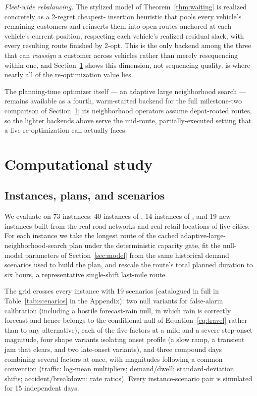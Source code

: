 \documentclass[trsc,dblanonrev]{informs4}
\begin{document}
\emph{Fleet-wide rebalancing.} The stylized model of
Theorem~\ref{thm:waiting} is realized concretely as a 2-regret cheapest-
insertion heuristic that pools every vehicle's remaining customers and
reinserts them into open routes anchored at each vehicle's current
position, respecting each vehicle's realized residual slack, with every
resulting route finished by 2-opt. This is the only backend among the
three that can \emph{reassign} a customer across vehicles rather than
merely resequencing within one, and Section~\ref{sec:study} shows this
dimension, not sequencing quality, is where nearly all of the
re-optimization value lies.

The planning-time optimizer itself --- an adaptive large neighborhood
search --- remains available as a fourth, warm-started backend for the
full milestone-two comparison of Section~\ref{sec:study}; its
neighborhood operators assume depot-rooted routes, so the lighter
backends above serve the mid-route, partially-executed setting that a
live re-optimization call actually faces.

\section{Computational study}\label{sec:study}

\subsection{Instances, plans, and scenarios}

We evaluate on 73 instances: 40
instances of \citet{dethloff2001vehicle}, 14 instances of
\citet{salhi1999cluster}, and 19 new instances built from the real road
networks and real retail locations of five cities. For each instance we
take the longest route of the cached
adaptive-large-neighborhood-search plan under the deterministic
capacity gate, fit the null-model parameters of
Section~\ref{sec:model} from the same historical demand scenarios used
to build the plan, and rescale the route's total planned duration to
six hours, a representative single-shift last-mile route.

The grid crosses every instance with 19 scenarios (catalogued in full
in Table~\ref{tab:scenarios} in the Appendix): two null variants for
false-alarm calibration (including a hostile forecast-rain null, in
which rain is correctly forecast and hence belongs to the conditional
null of Equation~\eqref{eq:travel} rather than to any alternative),
each of the five factors at a mild and a severe step-onset magnitude,
four shape variants isolating onset profile (a slow ramp, a transient
jam that clears, and two late-onset variants), and three compound days
combining several factors at once, with magnitudes following a common
convention (traffic: log-mean multipliers; demand/dwell:
standard-deviation shifts; accident/breakdown: rate ratios). Every
instance-scenario pair is simulated for 15 independent days.
\end{document}
